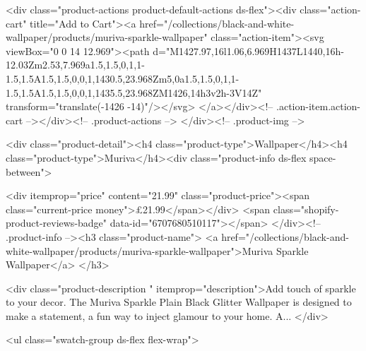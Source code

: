 {{{{{{{<div class="product-actions product-default-actions ds-flex"><div class="action-cart" title="Add to Cart"><a href="/collections/black-and-white-wallpaper/products/muriva-sparkle-wallpaper" class="action-item"><svg viewBox="0 0 14 12.969"><path d="M1427.97,16l1.06,6.969H1437L1440,16h-12.03Zm2.53,7.969a1.5,1.5,0,1,1-1.5,1.5A1.5,1.5,0,0,1,1430.5,23.968Zm5,0a1.5,1.5,0,1,1-1.5,1.5A1.5,1.5,0,0,1,1435.5,23.968ZM1426,14h3v2h-3V14Z" transform="translate(-1426 -14)"/></svg>
</a></div><!-- .action-item.action-cart --></div><!-- .product-actions -->
</div><!-- .product-img -->

<div class="product-detail"><h4 class="product-type">Wallpaper</h4><h4 class="product-type">Muriva</h4><div class="product-info ds-flex space-between">
    
<div itemprop="price" content="21.99" class="product-price"><span class="current-price money">£21.99</span></div>
    <span class="shopify-product-reviews-badge" data-id="6707680510117"></span>
  </div><!-- .product-info --><h3 class="product-name">
      <a href="/collections/black-and-white-wallpaper/products/muriva-sparkle-wallpaper">Muriva Sparkle Wallpaper</a>
    </h3>
    
<div class="product-description " itemprop="description">Add touch of sparkle to your decor. The Muriva Sparkle Plain Black Glitter Wallpaper is designed to make a statement, a fun way to inject glamour to your home. A...
</div>



<ul class="swatch-group ds-flex flex-wrap">
        
}}}}}}}
